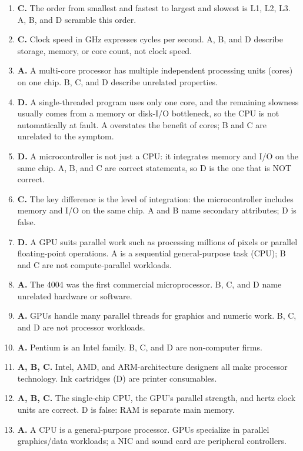 \begin{enumerate}[label=\textbf{Q\arabic*.}, leftmargin=*]
  and D confuse the levels or their role; C wrongly places cache on the hard
  disk.
\item \textbf{C.} The order from smallest and fastest to largest and slowest is
  L1, L2, L3. A, B, and D scramble this order.
\item \textbf{C.} Clock speed in GHz expresses cycles per second. A, B, and D
  describe storage, memory, or core count, not clock speed.
\item \textbf{A.} A multi-core processor has multiple independent processing
  units (cores) on one chip. B, C, and D describe unrelated properties.
\item \textbf{D.} A single-threaded program uses only one core, and the
  remaining slowness usually comes from a memory or disk-I/O bottleneck, so
  the CPU is not automatically at fault. A overstates the benefit of cores; B
  and C are unrelated to the symptom.
\item \textbf{D.} A microcontroller is not just a CPU: it integrates memory and
  I/O on the same chip. A, B, and C are correct statements, so D is the one
  that is NOT correct.
\item \textbf{C.} The key difference is the level of integration: the
  microcontroller includes memory and I/O on the same chip. A and B name
  secondary attributes; D is false.
\item \textbf{D.} A GPU suits parallel work such as processing millions of
  pixels or parallel floating-point operations. A is a sequential
  general-purpose task (CPU); B and C are not compute-parallel workloads.

\item \textbf{A.} The 4004 was the first commercial microprocessor. B, C, and D name unrelated hardware or software.
\item \textbf{A.} GPUs handle many parallel threads for graphics and numeric work. B, C, and D are not processor workloads.
\item \textbf{A.} Pentium is an Intel family. B, C, and D are non-computer firms.
\item \textbf{A, B, C.} Intel, AMD, and ARM-architecture designers all make processor technology. Ink cartridges (D) are printer consumables.
\item \textbf{A, B, C.} The single-chip CPU, the GPU's parallel strength, and hertz clock units are correct. D is false: RAM is separate main memory.
\item \textbf{A.} A CPU is a general-purpose processor. GPUs specialize in parallel graphics/data workloads; a NIC and sound card are peripheral controllers.


\end{enumerate}
